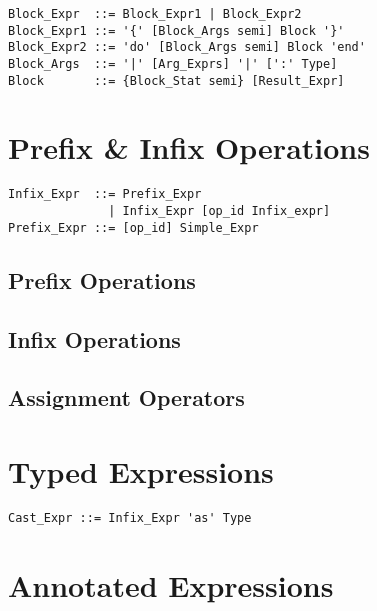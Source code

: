 \syntax\begin{lstlisting}
Block_Expr  ::= Block_Expr1 | Block_Expr2
Block_Expr1 ::= '{' [Block_Args semi] Block '}'
Block_Expr2 ::= 'do' [Block_Args semi] Block 'end'
Block_Args  ::= '|' [Arg_Exprs] '|' [':' Type]
Block       ::= {Block_Stat semi} [Result_Expr]
\end{lstlisting}






\section{Prefix \& Infix Operations}
\label{sec:prefix-infix-ops}

\syntax\begin{lstlisting}
Infix_Expr  ::= Prefix_Expr
              | Infix_Expr [op_id Infix_expr]
Prefix_Expr ::= [op_id] Simple_Expr
\end{lstlisting}






\subsection{Prefix Operations}

\subsection{Infix Operations}

\subsection{Assignment Operators}

\section{Typed Expressions}

\syntax\begin{lstlisting}
Cast_Expr ::= Infix_Expr 'as' Type
\end{lstlisting}







\section{Annotated Expressions}
\label{sec:annotated-exprs}

